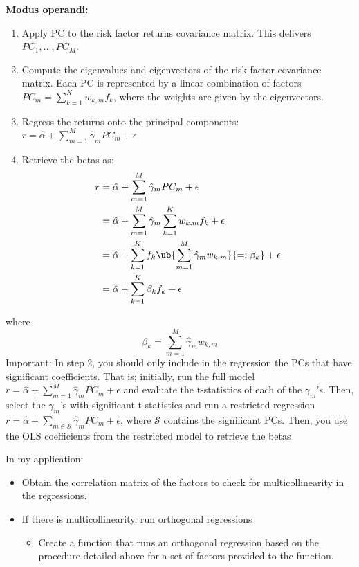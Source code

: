 \textbf{Modus operandi:}
\begin{enumerate}[noitemsep]
  \item Apply PC to the risk factor returns covariance matrix. This delivers $PC_1,..., PC_M$. 
  \item Compute the eigenvalues and eigenvectors of the risk factor covariance matrix. Each PC is represented by a linear combination of factors $PC_m= \sum_{k=1}^K w_{k,m} f_k$, where the weights are given by the eigenvectors.
  \item Regress the returns onto the principal components: $r = \hat \alpha + \sum_{m=1}^M \hat \gamma_m PC_m + \epsilon $
  \item Retrieve the betas as: 
\begin{align*}
r 
&= \hat \alpha + \sum_{m=1}^M \hat \gamma_m PC_m + \epsilon 
\\
&= \hat \alpha + \sum_{m=1}^M \hat \gamma_m \sum_{k=1}^K w_{k,m} f_k + \epsilon 
\\
&= \hat \alpha +  \sum_{k=1}^K f_k \ub{\sum_{m=1}^M \hat \gamma_m w_{k,m}}{=:\beta_k}  + \epsilon 
\\
&= \hat \alpha +  \sum_{k=1}^K \beta_k f_k  + \epsilon 
\end{align*}
\end{enumerate}
where
$$
\beta_k = \sum_{m=1}^M \hat \gamma_m w_{k,m}
$$
Important: In step 2, you should only include in the regression the PCs that have significant coefficients. That is; initially, run the full model $r = \hat \alpha + \sum_{m=1}^M \hat \gamma_m PC_m + \epsilon $ and evaluate the t-statistics of each of the $\gamma_m$'s. Then, select the $\gamma_m$'s with significant t-statistics and run a restricted regression $r = \hat \alpha + \sum_{m\in \mathcal S} \hat \gamma_m PC_m + \epsilon $, where $\mathcal S$ contains the significant PCs. Then, you use the OLS coefficients from the restricted model to retrieve the betas

In my application: 
\begin{itemize}[leftmargin=*,noitemsep]
  \item Obtain the correlation matrix of the factors to check for multicollinearity in the regressions.
  \item If there is multicollinearity, run orthogonal regressions
\begin{itemize}[leftmargin=*,noitemsep]
  \item Create a function that runs an orthogonal regression based on the procedure detailed above for a set of factors provided to the function.
\end{itemize}

\end{itemize}




